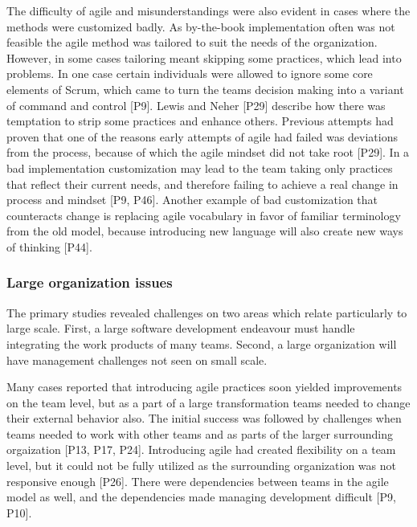 \documentclass[preprint,authoryear,12pt]{elsarticle}
\begin{document}
The difficulty of agile and misunderstandings were also evident in cases where
the methods were customized badly. As by-the-book implementation often was not
feasible the agile method was tailored to suit the needs of the organization.
However, in some cases tailoring meant skipping some practices, which lead into
problems. In one case certain individuals were allowed to ignore some core
elements of Scrum, which came to turn the teams decision making into a variant
of command and control [P9].
Lewis and Neher [P29] describe how there was temptation to strip some practices
and enhance others. Previous attempts had proven that one of the reasons early
attempts of agile had failed was deviations from the process, because of which
the agile mindset did not take root [P29]. In a bad implementation customization
may lead to the team taking only practices that reflect their current needs, and
therefore failing to achieve a real change in process and mindset [P9, P46].
Another example of bad customization that counteracts change is replacing agile
vocabulary in favor of familiar terminology from the old model, because
introducing new language will also create new ways of thinking [P44].


\subsubsection{Large organization issues}


The primary studies revealed challenges on two areas which relate particularly
to large scale. First, a large software development endeavour must handle
integrating the work products of many teams. Second, a large organization will
have management challenges not seen on small scale.






Many cases reported that introducing agile practices soon yielded improvements
on the team level, but as a part of a large transformation teams needed to
change their external behavior also.
The initial success was followed by challenges when teams needed to work with
other teams and as parts of the larger surrounding orgaization [P13, P17, P24].
Introducing agile had created flexibility on a team level, but it could not be
fully utilized as the surrounding organization was not responsive enough [P26].
There were dependencies between teams in the agile model as well, and the
dependencies made managing development difficult [P9, P10].
\end{document}
